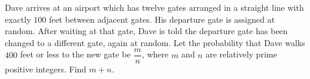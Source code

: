 Dave arrives at an airport which has twelve gates arranged in a straight line with exactly $100$ feet between adjacent gates. His departure gate is assigned at random. After waiting at that gate, Dave is told the departure gate has been changed to a different gate, again at random. Let the probability that Dave walks $400$ feet or less to the new gate be $\dfrac{m}{n}$, where $m$ and $n$ are relatively prime positive integers. Find $m+n$.
